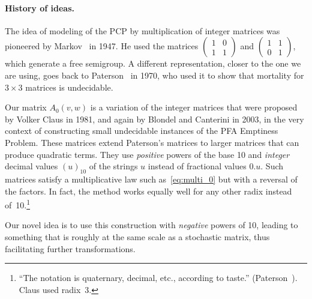 \documentclass[a4paper,cleveref, autoref, thm-restate]{lipics-v2021}
\begin{document}
\paragraph{History of ideas.}
The idea of
modeling of the PCP by multiplication of integer matrices
was
pioneered by %
Markov~\cite{Markov-1947} in 1947. He
used the matrices
$(
\begin{smallmatrix}
  1&0\\1&1
\end{smallmatrix}
)$
and $(
\begin{smallmatrix}
  1&1\\0&1
\end{smallmatrix}
)$,
which generate a free semigroup.
%
A different representation, closer to the one we are using,
goes back to
Paterson~\cite{paterson70}
in 1970, who used it to show that mortality for $3\times 3$
 matrices is undecidable. %

Our matrix $A_0(v,w)$ is a variation of the integer matrices that were
proposed
by Volker Claus \cite{claus81} in 1981,
and again by Blondel and Canterini \cite[p.~235]{blondel-canterini-03} in
2003,
in the very context of constructing small
undecidable instances of the PFA Emptiness Problem.
These matrices extend Paterson's matrices to
larger matrices that can produce quadratic terms.
They %
use \emph{positive} powers of the base 10
and \emph{integer} decimal values $(u)_{10}$ of the strings $u$ instead of fractional
values $0.u$.
Such matrices satisfy a multiplicative law such as~\eqref{eq:multi_0} but
with a reversal of
the factors.
In fact, the method works equally well for any other radix instead of~10.\footnote{ ``The notation is quaternary, decimal, etc., according
  to taste.'' (Paterson~\cite{paterson70}).
Claus
\cite{claus81} %
used radix~3. %
}



Our novel idea is to use this construction
with \emph{negative} powers of 10, leading to something that is roughly at
the same scale as a stochastic matrix, thus facilitating further
transformations.






 
\end{document}
